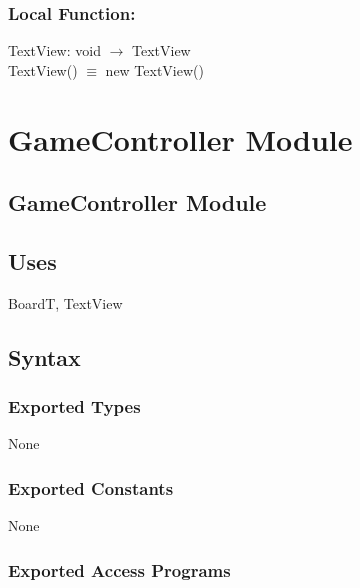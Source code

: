 \documentclass[12pt]{article}
\begin{document}
\subsubsection*{Local Function:}

TextView: void $\rightarrow$ TextView \\
TextView() $\equiv$ new TextView()

\newpage

\section* {GameController Module}

\subsection* {GameController Module}

\subsection* {Uses}

BoardT, TextView

\subsection* {Syntax}

\subsubsection* {Exported Types}

None

\subsubsection* {Exported Constants}

None

\subsubsection* {Exported Access Programs}
\end{document}
